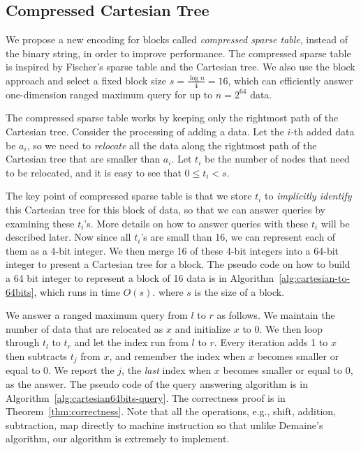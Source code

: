 
\subsection{Compressed Cartesian Tree} \label{sec:cct}

We propose a new encoding for blocks called {\em compressed sparse
  table}, instead of the binary string, in order to improve
performance.  The compressed sparse table is inspired by Fischer's
sparse table and the Cartesian tree.  We also use the block approach
and select a fixed block size $s = {{\frac{\log n}{4}}} = 16$, which
can efficiently answer one-dimension ranged maximum query for up to $n
= 2^{64}$ data.

The compressed sparse table works by keeping only the {\rm rightmost}
path of the Cartesian tree.  Consider the processing of adding a data.
Let the $i$-th added data be $a_i$, so we need to {\em relocate} all
the data along the rightmost path of the Cartesian tree that are
smaller than $a_i$.  Let $t_i$ be the number of nodes that need to be
relocated, and it is easy to see that $0 \le t_i < s$.

The key point of compressed sparse table is that we store $t_i$ to
{\em implicitly identify} this Cartesian tree for this block of data,
so that we can answer queries by examining these $t_i$'s.  More
details on how to answer queries with these $t_i$ will be described
later.  Now since all $t_i$'s are small than 16, we can represent each
of them as a 4-bit integer.  We then merge 16 of these 4-bit integers
into a 64-bit integer to present a Cartesian tree for a block.  The
pseudo code on how to build a 64 bit integer to represent a block of
16 data is in Algorithm~\ref{alg:cartesian-to-64bits}, which runs in
time $O(s)$. where $s$ is the size of a block.



We answer a ranged maximum query from $l$ to $r$ as follows.  We
maintain the number of data that are relocated as $x$ and initialize
$x$ to 0.  We then loop through $t_l$ to $t_r$ and let the index run
from $l$ to $r$.  Every iteration adds 1 to $x$ then subtracts $t_j$
from $x$, and remember the index when $x$ becomes smaller or equal to
0.  We report the $j$, the {\em last} index when $x$ becomes smaller
or equal to 0, as the answer.  The pseudo code of the query answering
algorithm is in Algorithm~\ref{alg:cartesian64bits-query}.  The
correctness proof is in Theorem~\ref{thm:correctness}.  Note that all
the operations, e.g., shift, addition, subtraction, map directly to
machine instruction so that unlike Demaine's algorithm, our algorithm
is extremely to implement.

